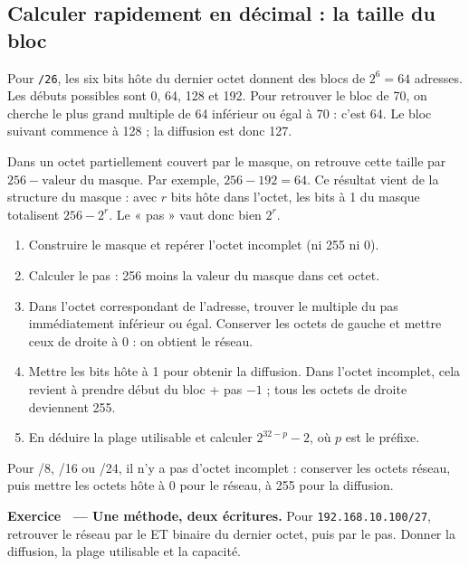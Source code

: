 \documentclass[11pt,a4paper]{article}
\newif\ifcorrige
\newcommand{\ip}[1]{\textcolor{ipred}{\texttt{#1}}}
\newcounter{exo}
\newcommand{\exo}[2]{%
  \Needspace{6cm}\stepcounter{exo}\begin{quest}\textbf{Exercice \theexo\ — #1.} #2\end{quest}}
\newcommand{\zone}[2]{%
  \ifcorrige
    \begin{tcolorbox}[colback=corrbg,colframe=corr,boxrule=0.6pt,arc=1pt,left=5pt,right=5pt,
      fontupper=\small\color{corr}]#2\end{tcolorbox}%
  \else
    \begin{tcolorbox}[colback=white,colframe=black!45,boxrule=0.5pt,arc=1pt,height=#1]\end{tcolorbox}%
  \fi}
\begin{document}
\Needspace{4cm}
\subsection*{Calculer rapidement en décimal : la taille du bloc}
Pour \ip{/26}, les six bits hôte du dernier octet donnent des blocs de $2^6=64$ adresses.
Les débuts possibles sont 0, 64, 128 et 192. Pour retrouver le bloc de 70, on cherche le plus grand
multiple de 64 inférieur ou égal à 70 : c'est 64. Le bloc suivant commence à 128 ; la diffusion est donc 127.

Dans un octet partiellement couvert par le masque, on retrouve cette taille par
$256-\text{valeur du masque}$. Par exemple, $256-192=64$.
Ce résultat vient de la structure du masque : avec $r$ bits hôte dans l'octet,
les bits à 1 du masque totalisent $256-2^r$. Le « pas » vaut donc bien $2^r$.

\begin{methode}
\begin{enumerate}
\item Construire le masque et repérer l'octet incomplet (ni 255 ni 0).
\item Calculer le pas : 256 moins la valeur du masque dans cet octet.
\item Dans l'octet correspondant de l'adresse, trouver le multiple du pas immédiatement inférieur ou égal.
Conserver les octets de gauche et mettre ceux de droite à 0 : on obtient le réseau.
\item Mettre les bits hôte à 1 pour obtenir la diffusion. Dans l'octet incomplet,
cela revient à prendre début du bloc + pas $-1$ ; tous les octets de droite deviennent 255.
\item En déduire la plage utilisable et calculer $2^{32-p}-2$, où $p$ est le préfixe.
\end{enumerate}
Pour /8, /16 ou /24, il n'y a pas d'octet incomplet : conserver les octets réseau,
puis mettre les octets hôte à 0 pour le réseau, à 255 pour la diffusion.
\end{methode}

\exo{Une méthode, deux écritures}{Pour \ip{192.168.10.100/27}, retrouver le réseau
par le ET binaire du dernier octet, puis par le pas. Donner la diffusion, la plage utilisable et la capacité.}
\zone{2.4cm}{Masque /27 : \ip{255.255.255.224}.
$100=\texttt{01100100}$ et $224=\texttt{11100000}$ ; leur ET vaut \texttt{01100000}, soit 96.
Pas $256-224=32$ : $96\leq100<128$.
Réseau \ip{192.168.10.96}, diffusion \ip{192.168.10.127}, utilisables .97 à .126.
Il reste 5 bits hôte : $2^5-2=30$ adresses utilisables.}
\end{document}

